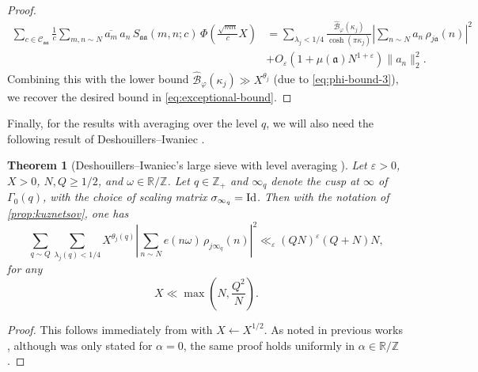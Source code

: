 \documentclass[reqno,11pt]{amsart}
\newtheorem{knowntheorem}{Theorem}
\theoremstyle{remark}
\numberwithin{equation}{section}
\newcommand{\Z}{\mathbb{Z}}
\newcommand{\R}{\mathbb{R}}
\newcommand{\mB}{\mathcal{B}}
\newcommand{\mC}{\mathcal{C}}
\newcommand{\ma}{\mathfrak{a}}
\newcommand{\Id}{\textnormal{Id}}
\newcommand{\eps}{\varepsilon}
\renewcommand{\bar}{\overline}
\renewcommand{\hat}{\widehat}
\newcommand{\ch}{\cosh}
\begin{document}
\begin{proof}
\begin{equation} \label{eq:Kloosterman-and-exceptional}
\begin{aligned}
    \sum_{c \in \mC_{\ma\ma}} \frac{1}{c} 
    \sum_{m,n \sim N} \bar{a_m}\, a_n\, S_{\ma \ma}(m, n; c)\, \Phi\left(\frac{\sqrt{mn}}{c} X\right)
    &= 
    \sum_{\lambda_j < 1/4} \frac{\hat{\mB}_\varphi(\kappa_j)}{\ch(\pi \kappa_j)} \left\vert \sum_{n \sim N} a_n\, \rho_{j\ma}(n) \right\vert^2
    \\
    &+
    O_\eps\left(1 + \mu(\ma) N^{1+\eps}\right) \|a_n\|_2^2.
\end{aligned}
\end{equation}
Combining this with the lower bound $\hat{\mB}_\varphi(\kappa_j) \gg X^{\theta_j}$ (due to \cref{eq:phi-bound-3}), we recover the desired bound in \cref{eq:exceptional-bound}. 
\end{proof}


Finally, for the results with averaging over the level $q$, we will also need the following result of Deshouillers--Iwaniec \cite{deshouillers1982kloosterman}.

\begin{knowntheorem}[Deshouillers--Iwaniec's large sieve with level averaging \cite{deshouillers1982kloosterman}] \label{thm:large-sieve-level-avg}
Let $\eps > 0$, $X > 0$, $N, Q \ge 1/2$, and $\omega \in \R/\Z$. Let $q \in \Z_+$ and $\infty_q$ denote the cusp at $\infty$ of $\Gamma_0(q)$, with the choice of scaling matrix $\sigma_{\infty_q} = \Id$. Then with the notation of \cref{prop:kuznetsov}, one has
\begin{equation}
    \sum_{q \sim Q} \sum_{\lambda_j(q) < 1/4}
    X^{\theta_j(q)} 
    \left\vert 
    \sum_{n \sim N} e(n\omega)\, \rho_{j\infty_q}(n)
    \right\vert^2 
    \ll_\eps 
    (QN)^\eps
    \left(Q + N\right) N,
\end{equation}
for any
\begin{equation}
    X \ll \max\left(N, \frac{Q^2}{N}\right).
\end{equation}
\end{knowntheorem}

\begin{proof}
This follows immediately from \cite[Theorem 1.7]{deshouillers1982kloosterman} with $X \gets X^{1/2}$. As noted in previous works \cite{pascadi2023smooth,bombieri1987primes2,de2020niveau}, although \cite[Theorem 7]{deshouillers1982kloosterman} was only stated for $\alpha = 0$, the same proof holds uniformly in $\alpha \in \R/\Z$. 
\end{proof}
\end{document}
